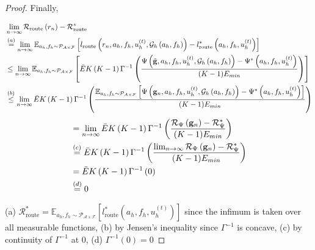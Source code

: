 \documentclass{article}
\begin{document}
\begin{proof}
Finally,

\begin{align*}
    &\lim_{n \to \infty }\mathcal{R}_{\text{route}}\left(r_n\right) - \mathcal{R}_{\text{route}}^* \\
    &\overset{(a)}{=} \lim_{n \to \infty } \mathbb{E}_{a_h, f_h \sim \mathcal{P}_{\mathcal{A} \times \mathcal{F}}}\left[l_{\text{route}}\left(r_n, a_h, f_h, u^{(t)}_h, \mathcal{G}_h\left(a_h, f_h\right)\right) - l_{\text{route}}^*\left(a_h, f_h, u^{(t)}_h\right)\right] \\
    &\leq \lim_{n \to \infty } \mathbb{E}_{a_h, f_h \sim \mathcal{P}_{\mathcal{A} \times \mathcal{F}}}\left[\Bar{E}K\left(K- 1\right)\Gamma^{-1}\left(\frac{\Psi\left(\tilde{\mathbf{g}}, a_h, f_h, u^{(t)}_h, \mathcal{G}_h\left(a_h, f_h\right)\right)- \Psi^*\left(a_h, f_h, u^{(t)}_h\right)}{(K - 1)E_{min}} \right)\right] \\
    &\overset{(b)}{\leq} \lim_{n \to \infty } \Bar{E}K\left(K- 1\right)\Gamma^{-1}\left(\frac{\mathbb{E}_{a_h, f_h \sim \mathcal{P}_{\mathcal{A} \times \mathcal{F}}}\left[\Psi\left(\mathbf{g}_n, a_h, f_h, u^{(t)}_h, \mathcal{G}_h\left(a_h, f_h\right)\right)- \Psi^*\left(a_h, f_h, u^{(t)}_h\right) \right]}{(K - 1)E_{min}}\right) \\
\end{align*}
\begin{align*}
    &= \lim_{n \to \infty } \Bar{E}K\left(K- 1\right)\Gamma^{-1}\left(\frac{\mathcal{R}_{\Psi}\left(\mathbf{g}_n\right) - \mathcal{R}_{\Psi}^*}{(K - 1)E_{min}}\right) \\
    &\overset{(c)}{=} \Bar{E}K\left(K- 1\right)\Gamma^{-1}\left(\frac{\lim_{n \to \infty } \mathcal{R}_{\Psi}\left(\mathbf{g}_n\right) - \mathcal{R}_{\Psi}^*}{(K - 1)E_{min}}\right) \\
    &= \Bar{E}K\left(K- 1\right)\Gamma^{-1}\left(0\right) \\
    &\overset{(d)}{=} 0
\end{align*}

(a) $\mathcal{R}_{\text{route}}^*  = \mathbb{E}_{a_h, f_h \sim \mathcal{P}_{\mathcal{A} \times \mathcal{F}}}\left[l_{\text{route}}^*\left(a_h, f_h, u^{(t)}_h\right)\right]$ since the infimum is taken over all measurable functions, (b) by Jensen's inequality since $\Gamma^{-1}$ is concave, (c) by continuity of $\Gamma^{-1}$ at $0$, (d) $\Gamma^{-1}(0) = 0$



\end{proof}
\end{document}
